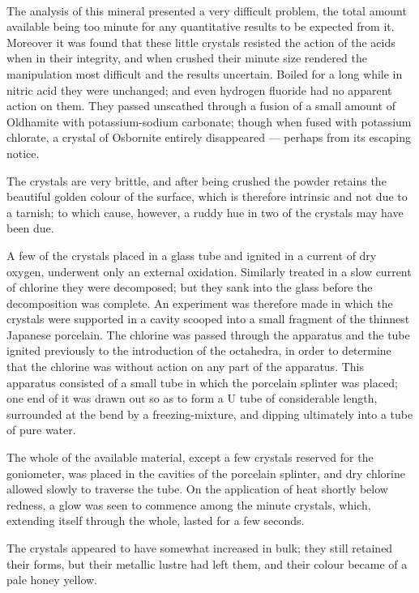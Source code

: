 \documentclass[a4paper, 12pt, oneside]{article}
\begin{document}
\paragraph{}
The analysis of this mineral presented a very difficult problem, the total amount available being too minute for any quantitative results to be expected from it. Moreover it was found that these little crystals resisted the action of the acids when in their integrity, and when crushed their minute size rendered the manipulation most difficult and the results uncertain. Boiled for a long while in nitric acid they were unchanged; and even hydrogen fluoride had no apparent action on them. They passed unscathed through a fusion of a small amount of Oldhamite with potassium-sodium carbonate; though when fused with potassium chlorate, a crystal of Osbornite entirely disappeared --- perhaps from its escaping notice.

The crystals are very brittle, and after being crushed the powder retains the beautiful golden colour of the surface, which is therefore intrinsic and not due to a tarnish; to which cause, however, a ruddy hue in two of the crystals may have been due.

A few of the crystals placed in a glass tube and ignited in a current of dry oxygen, underwent only an external oxidation. Similarly treated in a slow current of chlorine they were decomposed; but they sank into the glass before the decomposition was complete. An experiment was therefore made in which the crystals were supported in a cavity scooped into a small fragment of the thinnest Japanese porcelain. The chlorine was passed through the apparatus and the tube ignited previously to the introduction of the octahedra, in order to determine that the chlorine was without action on any part of the apparatus. This apparatus consisted of a small tube in which the porcelain splinter was placed; one end of it was drawn out so as to form a U tube of considerable length, surrounded at the bend by a freezing-mixture, and dipping ultimately into a tube of pure water.

The whole of the available material, except a few crystals reserved for the goniometer, was placed in the cavities of the porcelain splinter, and dry chlorine allowed slowly to traverse the tube. On the application of heat shortly below redness, a glow was seen to commence among the minute crystals, which, extending itself through the whole, lasted for a few seconds.

The crystals appeared to have somewhat increased in bulk; they still retained their forms, but their metallic lustre had left them, and their colour became of a pale honey yellow.
\end{document}
